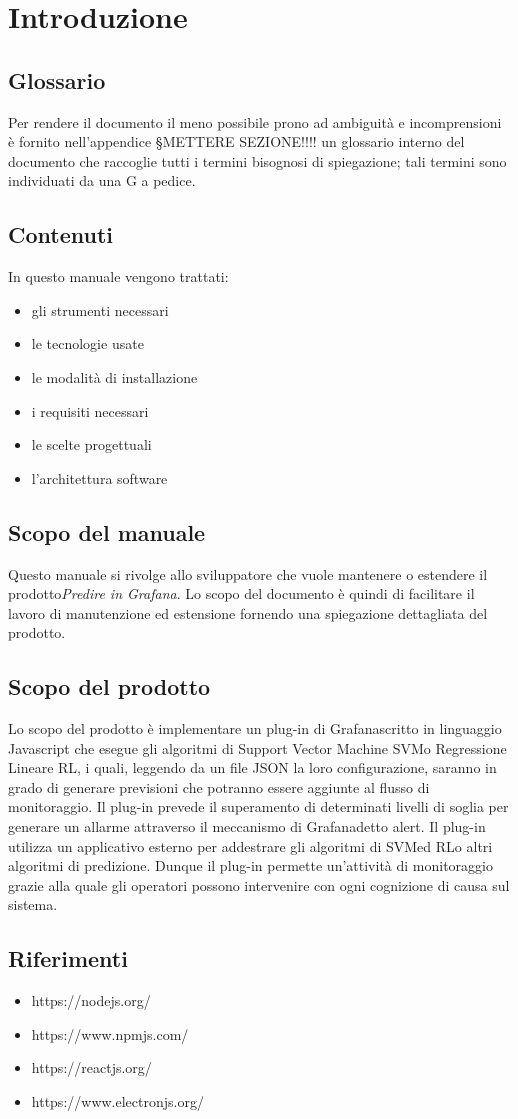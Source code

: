 \section{Introduzione}
\subsection{Glossario}
Per rendere il documento il meno possibile prono ad ambiguità e incomprensioni è fornito nell'appendice §{METTERE SEZIONE!!!!} un glossario interno del documento che raccoglie tutti i termini bisognosi di spiegazione; tali termini sono individuati da una G a pedice.
\subsection{Contenuti}
In questo manuale vengono trattati:
\begin{itemize}
	\item gli strumenti necessari
	\item le tecnologie usate
	\item le modalità di installazione
	\item i requisiti necessari
	\item le scelte progettuali
	\item l'architettura software
\end{itemize}

\subsection{Scopo del manuale}
Questo manuale si rivolge allo sviluppatore che vuole mantenere o estendere il prodotto\glosp \textit{Predire in Grafana}. Lo scopo del documento è quindi di facilitare il lavoro di manutenzione ed estensione fornendo una spiegazione dettagliata del prodotto\glo.

\subsection{Scopo del prodotto}
Lo scopo del prodotto è implementare un plug-in di Grafana\glosp scritto in linguaggio Javascript che esegue gli algoritmi di Support Vector Machine SVM\glosp o Regressione Lineare RL\glo, i quali, leggendo da un file JSON la loro configurazione, saranno in grado di generare previsioni che potranno essere aggiunte al flusso di monitoraggio. Il plug-in prevede il superamento di determinati livelli di soglia per generare un allarme attraverso il meccanismo di Grafana\glosp detto alert\glo. Il plug-in utilizza un applicativo esterno per addestrare gli algoritmi di SVM\glosp ed RL\glosp o altri algoritmi di predizione. Dunque il plug-in permette un'attività di monitoraggio grazie alla quale gli operatori possono intervenire con ogni cognizione di causa sul sistema.

\subsection{Riferimenti}
\begin{itemize}
	\item https://nodejs.org/
	\item https://www.npmjs.com/
	\item https://reactjs.org/
	\item https://www.electronjs.org/
\end{itemize}

